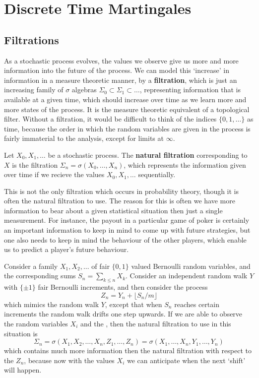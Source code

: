 \chapter{Discrete Time Martingales}

\section{Filtrations}

As a stochastic process evolves, the values we observe give us more and more information into the future of the process. We can model this `increase' in information in a measure theoretic manner, by a {\bf filtration}, which is just an increasing family of $\sigma$ algebras $\Sigma_0 \subset \Sigma_1 \subset \dots$, representing information that is available at a given time, which should increase over time as we learn more and more states of the process. It is the measure theoretic equivalent of a topological filter. Without a filtration, it would be difficult to think of the indices $\{ 0, 1, \dots \}$ as time, because the order in which the random variables are given in the process is fairly immaterial to the analysis, except for limits at $\infty$.

\begin{example}
    Let $X_0, X_1, \dots$ be a stochastic process. The {\bf natural filtration} corresponding to $X$ is the filtration $\Sigma_n = \sigma(X_0, \dots, X_n)$, which represents the information given over time if we recieve the values $X_0, X_1, \dots$ sequentially.
\end{example}

This is not the only filtration which occurs in probability theory, though it is often the natural filtration to use. The reason for this is often we have more information to bear about a given statistical situation then just a single measurement. For instance, the payout in a particular game of poker is certainly an important information to keep in mind to come up with future strategies, but one also needs to keep in mind the behaviour of the other players, which enable us to predict a player's future behaviour.

\begin{example}
    Consider a family $X_1, X_2, \dots$ of fair $\{ 0,1 \}$ valued Bernoulli random variables, and the corresponding sums $S_n = \sum_{k \leq n} X_k$. Consider an independent random walk $Y$ with $\{ \pm 1 \}$ fair Bernoulli increments, and then consider the process
    \[ Z_n = Y_n + \lfloor S_n/m \rfloor \]
    which mimics the random walk $Y$, except that when $S_n$ reaches certain increments the random walk drifts one step upwards. If we are able to observe the random variables $X_i$ and the , then the natural filtration to use in this situation is
    \[ \Sigma_n = \sigma(X_1,X_2,\dots,X_n,Z_1, \dots, Z_n) = \sigma(X_1,\dots,X_n,Y_1,\dots,Y_n) \]
    which contains much more information then the natural filtration with respect to the $Z_n$, because now with the values $X_i$ we can anticipate when the next `shift' will happen.
\end{example}

